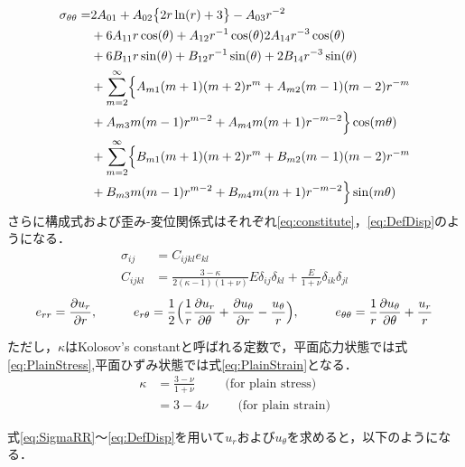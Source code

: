 \begin{align}
\sigma_{\theta\theta} =&2A_{01}
+A_{02}\bigl\{ 2r\ln(r)+3\bigr\}
-A_{03}r^{-2}
\nonumber
\\
&+6A_{11}r\cos(\theta)
+A_{12}r^{-1}\cos(\theta)
2A_{14}r^{-3}\cos(\theta)
\nonumber
\\
&+6B_{11}r\sin(\theta)
+B_{12}r^{-1}\sin(\theta)
+2B_{14}r^{-3}\sin(\theta)
\nonumber
\\
&+\sum_{m=2}^{\infty}\Bigl\{A_{m1}(m+1)(m+2)r^{m}
+A_{m2}(m-1)(m-2)r^{-m}
\nonumber
\\
&+A_{m3}m(m-1)r^{m-2}
+A_{m4}m(m+1)r^{-m-2}\Bigr\}\cos(m\theta)
\nonumber
\\
&+\sum_{m=2}^{\infty}\Bigl\{B_{m1}(m+1)(m+2)r^{m}
+B_{m2}(m-1)(m-2)r^{-m}
\nonumber
\\
&+B_{m3}m(m-1)r^{m-2}
+B_{m4}m(m+1)r^{-m-2}\Bigr\}\sin(m\theta)
\label{eq:SigmaThTh}
\end{align}
さらに構成式および歪み-変位関係式はそれぞれ\eqref{eq:constitute}，\eqref{eq:DefDisp}のようになる．
\begin{align}
\sigma_{ij}&=C_{ijkl}e_{kl}
\nonumber
\\
C_{ijkl}&=\frac{3-\kappa}{2(\kappa-1)(1+\nu)}E\delta_{ij}\delta_{kl}+\frac{E}{1+\nu}\delta_{ik}\delta_{jl}
\label{eq:constitute}
\end{align}
\begin{align}
e_{rr}=\frac{\partial u_{r}}{\partial r},\hspace{1cm}
e_{r\theta}=\frac{1}{2}\Bigl( \frac{1}{r}\frac{\partial u_{r}}{\partial \theta}
+\frac{\partial u_{\theta}}{\partial r}-\frac{u_{\theta}}{r}\Bigr),\hspace{1cm}
e_{\theta\theta}=\frac{1}{r}\frac{\partial u_{\theta}}{\partial \theta}+\frac{u_{r}}{r}
\label{eq:DefDisp}
\end{align}

ただし，$\kappa$はKolosov's constantと呼ばれる定数で，平面応力状態では式\eqref{eq:PlainStress},平面ひずみ状態では式\eqref{eq:PlainStrain}となる．
\begin{align}
	\kappa&=\frac{3-\nu}{1+\nu}\hspace{1cm}\text{(for plain stress)}
	\label{eq:PlainStress}
	\\
	&=3-4\nu\hspace{1cm}\text{(for plain strain)}
	\label{eq:PlainStrain}
\end{align}


式\eqref{eq:SigmaRR}～\eqref{eq:DefDisp}を用いて$u_r$および$u_\theta$を求めると，以下のようになる．

